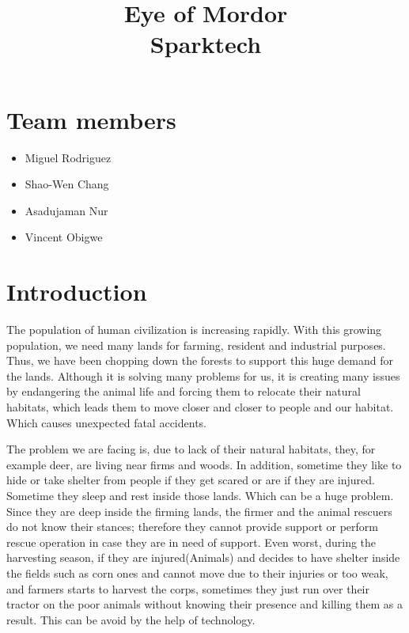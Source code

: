 \documentclass[12pt]{article}
\begin{document}
\title{\textbf{Eye of Mordor} \\Sparktech}
\maketitle

\section{Team members}
\begin{itemize}
\item Miguel Rodriguez
\item Shao-Wen Chang
\item Asadujaman Nur
\item Vincent Obigwe
\end{itemize}

\section{Introduction}

The population of human civilization is increasing rapidly. With this growing population, we need many lands for farming, resident and industrial purposes. Thus, we have been chopping down the forests to support this huge demand for the lands. Although it is solving many problems for us, it is creating many issues by endangering the animal life and forcing them to relocate their natural habitats, which leads them to move closer and closer to people and our habitat. Which causes unexpected fatal accidents.

The problem we are facing is, due to lack of their natural habitats, they, for example deer, are living near firms and woods. In addition, sometime they like to hide or take shelter from people if they get scared or are if they are injured. Sometime they sleep and rest inside those lands.  Which can be a huge problem. Since they are deep inside the firming lands, the firmer and the animal rescuers do not know their stances; therefore they cannot provide support or perform rescue operation in case they are in need of support. Even worst, during the harvesting season, if they are injured(Animals) and decides to have shelter inside the fields such as corn ones and cannot move due to their injuries or too weak, and farmers starts to harvest the corps, sometimes they just run over their tractor on the poor animals without knowing their presence and killing them as a result. This can be avoid by the help of technology. 
\end{document}
